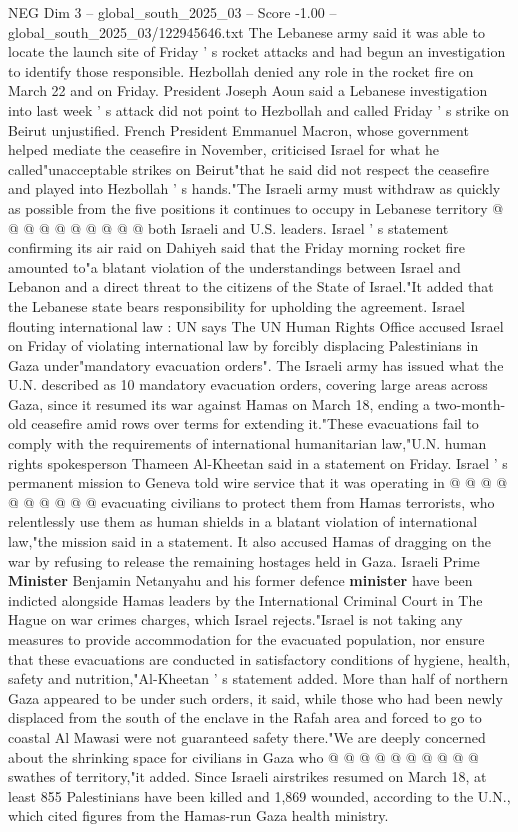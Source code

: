 \begin{textsample}{NEG Dim 3 – global\_south\_2025\_03 – Score -1.00 – global\_south\_2025\_03/122945646.txt}
The Lebanese army said it was able to locate the launch site of Friday ' s rocket attacks and had begun an investigation to identify those responsible.
Hezbollah denied any role in the rocket fire on March 22 and on Friday.
President Joseph Aoun said a Lebanese investigation into last week ' s attack did not point to Hezbollah and called Friday ' s strike on Beirut unjustified.
French President Emmanuel Macron, whose government helped mediate the ceasefire in November, criticised Israel for what he called"unacceptable strikes on Beirut"that he said did not respect the ceasefire and played into Hezbollah ' s hands."The Israeli army must withdraw as quickly as possible from the five positions it continues to occupy in Lebanese territory @ @ @ @ @ @ @ @ @ @ both Israeli and U.S. leaders.
Israel ' s statement confirming its air raid on Dahiyeh said that the Friday morning rocket fire amounted to"a blatant violation of the understandings between Israel and Lebanon and a direct threat to the citizens of the State of Israel."It added that the Lebanese state bears responsibility for upholding the agreement.
Israel flouting international law : UN says The UN Human Rights Office accused Israel on Friday of violating international law by forcibly displacing Palestinians in Gaza under"mandatory evacuation orders".
The Israeli army has issued what the U.N. described as 10 mandatory evacuation orders, covering large areas across Gaza, since it resumed its war against Hamas on March 18, ending a two-month-old ceasefire amid rows over terms for extending it."These evacuations fail to comply with the requirements of international humanitarian law,"U.N. human rights spokesperson Thameen Al-Kheetan said in a statement on Friday.
Israel ' s permanent mission to Geneva told wire service that it was operating in @ @ @ @ @ @ @ @ @ @ evacuating civilians to protect them from Hamas terrorists, who relentlessly use them as human shields in a blatant violation of international law,"the mission said in a statement.
It also accused Hamas of dragging on the war by refusing to release the remaining hostages held in Gaza.
Israeli Prime \textbf{Minister} Benjamin Netanyahu and his former defence \textbf{minister} have been indicted alongside Hamas leaders by the International Criminal Court in The Hague on war crimes charges, which Israel rejects."Israel is not taking any measures to provide accommodation for the evacuated population, nor ensure that these evacuations are conducted in satisfactory conditions of hygiene, health, safety and nutrition,"Al-Kheetan ' s statement added.
More than half of northern Gaza appeared to be under such orders, it said, while those who had been newly displaced from the south of the enclave in the Rafah area and forced to go to coastal Al Mawasi were not guaranteed safety there."We are deeply concerned about the shrinking space for civilians in Gaza who @ @ @ @ @ @ @ @ @ @ swathes of territory,"it added.
Since Israeli airstrikes resumed on March 18, at least 855 Palestinians have been killed and 1,869 wounded, according to the U.N., which cited figures from the Hamas-run Gaza health ministry.

\end{textsample}
